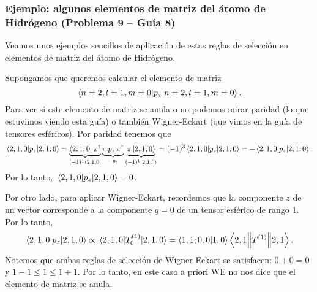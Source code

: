 \documentclass[10pt, a4paper]{article}
\numberwithin{equation}{subsection}
\begin{document}
\subsubsection{Ejemplo: algunos elementos de matriz del átomo de Hidrógeno
  (Problema 9 -- Guía 8)}

Veamos unos ejemplos sencillos de aplicación de estas reglas de selección en
elementos de matriz del átomo de Hidrógeno.

Supongamos que queremos calcular el elemento de matriz
\begin{equation}
  \matrixel{n=2,l=1,m=0}{p_z}{n=2,l=1,m=0}.
\end{equation}
Para ver si este elemento de matriz se anula o no podemos mirar paridad (lo que
estuvimos viendo esta guía) o también Wigner-Eckart (que vimos en la guía de
tensores esféricos). Por paridad tenemos que
\begin{equation}
  \matrixel{2,1,0}{p_z}{2,1,0}
  = \underbrace{\bra{2,1,0}\parityop^\dagger}_{(-1)^1\bra{2,1,0}}
    \underbrace{\parityop\,p_z\,\parityop^\dagger}_{-p_z}
    \underbrace{\parityop\ket{2,1,0}}_{(-1)^1\ket{2,1,0}}
  = (-1)^3 \matrixel{2,1,0}{p_z}{2,1,0}
  = -\matrixel{2,1,0}{p_z}{2,1,0}.
\end{equation}
Por lo tanto, $\matrixel{2,1,0}{p_z}{2,1,0} = 0$.

Por otro lado, para aplicar Wigner-Eckart, recordemos que la componente $z$ de
un vector corresponde a la componente $q = 0$ de un tensor esférico de rango
$1$. Por lo tanto,
\begin{equation}
  \matrixel{2,1,0}{p_z}{2,1,0}
  \propto \matrixel{2,1,0}{T^{(1)}_{0}}{2,1,0}
  = \braket{1,1;0,0}{1,0} \doublebarmel{2,1}{T^{(1)}}{2,1}.
\end{equation}
Notemos que ambas reglas de selección de Wigner-Eckart se satisfacen: $0 + 0 =
0$ y $1 - 1 \leq 1 \leq 1 + 1$. Por lo tanto, en este caso a priori WE no nos
dice que el elemento de matriz se anula.

\bigbreak
\end{document}
